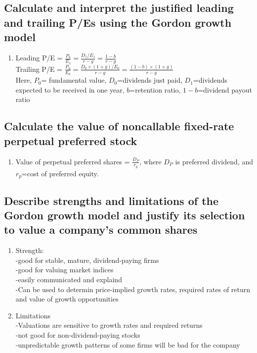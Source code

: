 \documentclass{article}
\newcommand{\be}{\begin{enumerate}}
\newcommand{\ee}{\end{enumerate}}
\begin{document}
\subsection{Calculate and interpret the justified leading and trailing P/Es using the Gordon
growth model}
\be
    \item Leading P/E = $\frac{P_0}{E_1}=\frac{D_1/E_1}{r-g}=\frac{1-b}{r-g}$
        \\Trailing P/E = $\frac{P_0}{E_0}=\frac{D_0\times(1+g)/E_0}{r-g}=\frac{(1-b)\times(1+g)}{r-g}$
        \\Here, $P_0$= fundamental value, $D_0$=dividends just paid, $D_1$=dividends
        expected to be received in one year, $b$=retention ratio, $1-b$=dividend payout ratio
\ee
\subsection{Calculate the value of noncallable fixed-rate perpetual preferred
stock}
\be
    \item Value of perpetual preferred shares = $\frac{D_P}{r_p}$, where $D_P$
        is preferred dividend, and $r_p$=cost of preferred equity.
\ee
\subsection{Describe strengths and limitations of the Gordon growth model and
justify its selection to value a company's common shares}
\be
    \item Strength:
        \\-good for stable, mature, dividend-paying firms
        \\-good for valuing market indices
        \\-easily communicated and explaind
        \\-Can be used to determin price-implied growth rates, required rates
        of return and value of growth opportunities
    \item Limitations
        \\-Valuations are sensitive to growth rates and required returns
        \\-not good for non-dividend-paying stocks
        \\-unpredictable growth patterns of some firms will be bad for the company
\ee
\end{document}
